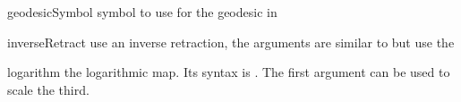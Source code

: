 \documentclass[english,a4paper,DIV=12,parskip=full,oneside]{scrartcl}
\begin{document}
\begin{commandlist}
		\par{}
		\par{} %
		\par{}
		\par{} %
		\par{}
		\par{} %
		\par{}
		\par{} %
		\par{} %
		\par{} %
		\par{} %
	\item[geodesicSymbol] symbol to use for the geodesic in \codeCommand{\geodesic}
		\par\mathCodeExample{\geodesicSymbol}
	\item[inverseRetract] use an inverse retraction, the arguments are similar to \codeCommand{\logarithm} but use the \codeCommand{\retractionSymbol}
	\par{}
	\par{}
	\par{}
	\item[logarithm] the logarithmic map.
		Its syntax is .
		The first argument can be used to scale the third.

\end{commandlist}
\end{document}

